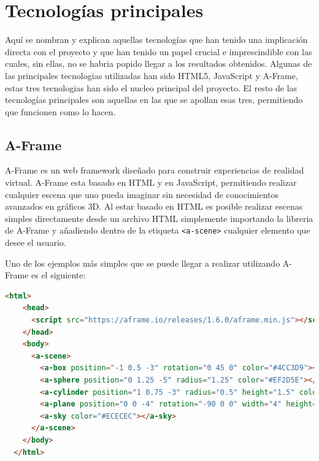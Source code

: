 \documentclass[a4paper, 12pt]{book}
\begin{document}
\section{Tecnologías principales} 
\label{sec:tecnologias-principales} %

Aquí se nombran y explican aquellas tecnologías que han tenido una implicación directa con el proyecto y que han tenido un papel crucial e imprescindible con las cuales, sin ellas, no se habria popido llegar a los resultados obtenidos. 
Algunas de las principales tecnologias utilizadas han sido HTML5, JavaScript y A-Frame, estas tres tecnologias han sido el nucleo principal del proyecto. El resto de las tecnologías principales 
son aquellas en las que se apollan esas tres, permitiendo que funcionen como lo hacen. 

\subsection{A-Frame}
\label{subsec: A-Frame}

A-Frame \cite{aframe_docs} es un web framework diseñado para construir experiencias de realidad virtual. A-Frame esta basado en HTML y en JavaScript, permitiendo realizar cualquier escena que uno pueda imaginar sin necesidad de conocimientos avanzados en gráficos 3D. 
Al estar basado en HTML es posible realizar escenas simples directamente desde un archivo HTML simplemente importando la libreria de A-Frame y añadiendo dentro de la etiqueta \texttt{<a-scene>} cualquier elemento que desee el usuario.  

Uno de los ejemplos más simples que se puede llegar a realizar utilizando A-Frame es el siguiente:

\begin{lstlisting}[language=HTML, caption=Escena A-Frame básica, captionpos=b]
  <html>
    <head>
      <script src="https://aframe.io/releases/1.6.0/aframe.min.js"></script>
    </head>
    <body>
      <a-scene>
        <a-box position="-1 0.5 -3" rotation="0 45 0" color="#4CC3D9"></a-box>
        <a-sphere position="0 1.25 -5" radius="1.25" color="#EF2D5E"></a-sphere>
        <a-cylinder position="1 0.75 -3" radius="0.5" height="1.5" color="#FFC65D"></a-cylinder>
        <a-plane position="0 0 -4" rotation="-90 0 0" width="4" height="4" color="#7BC8A4"></a-plane>
        <a-sky color="#ECECEC"></a-sky>
      </a-scene>
    </body>
  </html>
\end{lstlisting}
\end{document}
